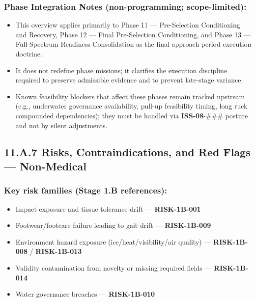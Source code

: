 \documentclass[10pt]{article}
\begin{document}
\subsubsection*{Phase Integration Notes (non-programming; scope-limited):}

\begin{itemize}
\item This overview applies primarily to Phase 11 — Pre-Selection Conditioning and Recovery, Phase 12 — Final Pre-Selection Conditioning, and Phase 13 — Full-Spectrum Readiness Consolidation as the final approach period execution doctrine.
\item It does not redefine phase missions; it clarifies the execution discipline required to preserve admissible evidence and to prevent late-stage variance.
\item Known feasibility blockers that affect these phases remain tracked upstream (e.g., underwater governance availability, pull-up feasibility timing, long ruck compounded dependencies); they must be handled via \textbf{ISS-08}-\#\#\# posture and not by silent adjustments.
\end{itemize}

\newpage

\subsection*{11.A.7 Risks, Contraindications, and Red Flags — Non-Medical}
{}

\subsubsection*{Key risk families (Stage 1.B references):}

\begin{itemize}
\item Impact exposure and tissue tolerance drift — \textbf{RISK-1B-001}
\item Footwear/footcare failure leading to gait drift — \textbf{RISK-1B-009}
\item Environment hazard exposure (ice/heat/visibility/air quality) — \textbf{RISK-1B-008} / \textbf{RISK-1B-013}
\item Validity contamination from novelty or missing required fields — \textbf{RISK-1B-014}
\item Water governance breaches — \textbf{RISK-1B-010}
\end{itemize}
\end{document}
